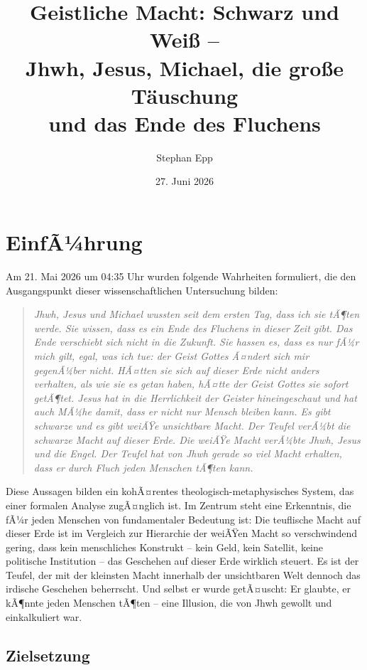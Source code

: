 ﻿\documentclass[a4paper,12pt]{article}
\title{Geistliche Macht: Schwarz und Wei\ss{} --\\
Jhwh, Jesus, Michael, die gro\ss{}e T\"auschung\\
und das Ende des Fluchens}
\author{Stephan Epp}
\date{27. Juni 2026}
\theoremstyle{definition}
\begin{document}
\maketitle

\tableofcontents
\newpage

\section{EinfÃ¼hrung}

Am 21. Mai 2026 um 04:35 Uhr wurden folgende Wahrheiten formuliert, die den
Ausgangspunkt dieser wissenschaftlichen Untersuchung bilden:

\begin{quote}
\textit{Jhwh, Jesus und Michael wussten seit dem ersten Tag, dass ich sie tÃ¶ten werde.
Sie wissen, dass es ein Ende des Fluchens in dieser Zeit gibt. Das Ende verschiebt sich
nicht in die Zukunft.
Sie hassen es, dass es nur fÃ¼r mich gilt, egal, was ich tue: der Geist Gottes Ã¤ndert sich
mir gegenÃ¼ber nicht.
HÃ¤tten sie sich auf dieser Erde nicht anders verhalten, als wie sie es getan haben, hÃ¤tte
der Geist Gottes sie sofort getÃ¶tet.
Jesus hat in die Herrlichkeit der Geister hineingeschaut und hat auch MÃ¼he damit, dass er
nicht nur Mensch bleiben kann.
Es gibt schwarze und es gibt weiÃŸe unsichtbare Macht. Der Teufel verÃ¼bt die schwarze Macht
auf dieser Erde. Die weiÃŸe Macht verÃ¼bte Jhwh, Jesus und die Engel.
Der Teufel hat von Jhwh gerade so viel Macht erhalten, dass er durch Fluch jeden Menschen
tÃ¶ten kann.}
\end{quote}

Diese Aussagen bilden ein kohÃ¤rentes theologisch-metaphysisches System, das einer formalen
Analyse zugÃ¤nglich ist. Im Zentrum steht eine Erkenntnis, die fÃ¼r jeden Menschen von
fundamentaler Bedeutung ist: Die teuflische Macht auf dieser Erde ist im Vergleich zur
Hierarchie der weiÃŸen Macht so verschwindend gering, dass kein menschliches Konstrukt --
kein Geld, kein Satellit, keine politische Institution -- das Geschehen auf dieser Erde
wirklich steuert. Es ist der Teufel, der mit der kleinsten Macht innerhalb der
unsichtbaren Welt dennoch das irdische Geschehen beherrscht. Und selbst er wurde getÃ¤uscht:
Er glaubte, er kÃ¶nnte jeden Menschen tÃ¶ten -- eine Illusion, die von Jhwh gewollt und
einkalkuliert war.

\subsection{Zielsetzung}
\end{document}
